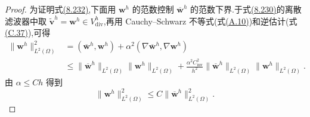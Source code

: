 \begin{lemma}
\begin{proof}
为证明式\hyperref[eq:navier-stokes-alpha-fem-stability-unfiltered]{(8.232)},下面用 $\bm{w}^h$ 的范数控制 $\overline{\bm{w}}^h$ 的范数下界.于式\hyperref[eq:navier-stokes-alpha-fem-velocity-only]{(8.230)}的离散滤波器中取 $\widetilde{\bm{v}}^h=\bm{w}^h\in V_{\mathrm{div}}^h$,再用 Cauchy--Schwarz 不等式(式\hyperref[eq:appendix-a-10]{(A.10)})和逆估计(式\hyperref[eq:appendix-c-37]{(C.37)}),可得
\[
\begin{aligned}
 \|\bm{w}^h\|_{L^2(\Omega)}^2
 &= (\overline{\bm{w}}^h,\bm{w}^h)
    +\alpha^2(\nabla\overline{\bm{w}}^h,\nabla\bm{w}^h)\\
 &\le \|\overline{\bm{w}}^h\|_{L^2(\Omega)}
      \|\bm{w}^h\|_{L^2(\Omega)}
  +\frac{\alpha^2 C_{\mathrm{inv}}^2}{h^2}
      \|\overline{\bm{w}}^h\|_{L^2(\Omega)}
      \|\bm{w}^h\|_{L^2(\Omega)}.
\end{aligned}
\]
由 $\alpha\le Ch$ 得到
\begin{equation}\label{eq:navier-stokes-alpha-fem-filter-norm-bound}
 \|\bm{w}^h\|_{L^2(\Omega)}^2
  \le C\|\overline{\bm{w}}^h\|_{L^2(\Omega)}^2.
\end{equation}


\end{proof}
\end{lemma}
